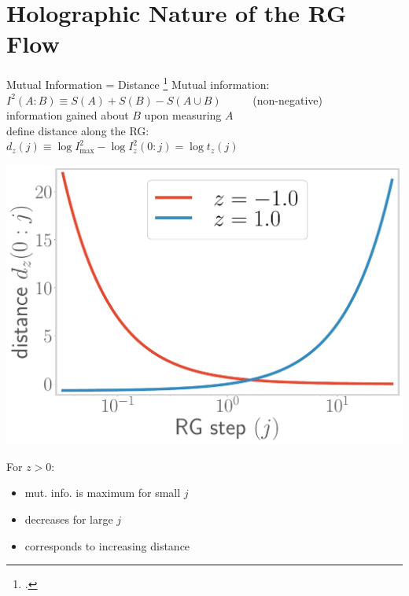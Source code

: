 \documentclass[12pt,aspectratio=169]{beamer}
\begin{document}
\section{Holographic Nature of the RG Flow}
\begin{frame}{Mutual Information = Distance}
\footcite{van2010building,lee2016,anirban_mott_2022}
	\alert{Mutual information}: ~ \(I^2(A:B) \equiv S(A) + S(B) - S(A \cup B)\) ~ ~ ~ (non-negative)\\[10pt]
	information gained about \(B\) upon measuring \(A\)\\[10pt]
	define distance along the RG: ~ ~ \(d_z(j) \equiv \log I^2_\text{max} - \log I_z^2(0:j) = \log t_z(j)\)

	\vspace*{\fill}

	\begin{minipage}{0.4\textwidth}
	\includegraphics[width=\textwidth]{figures/distance1.pdf}
	\end{minipage}
	\hspace*{\fill}
	\begin{minipage}{0.55\textwidth}
		\centering
		For \(z > 0\):\\[5pt]
		\begin{itemize}
			\item mut. info. is maximum for small \(j\)\\[10pt]
			\item decreases for large \(j\)\\[10pt]
			\item corresponds to \alert{increasing distance}
		\end{itemize}
	\end{minipage}
\end{frame}
\end{document}
